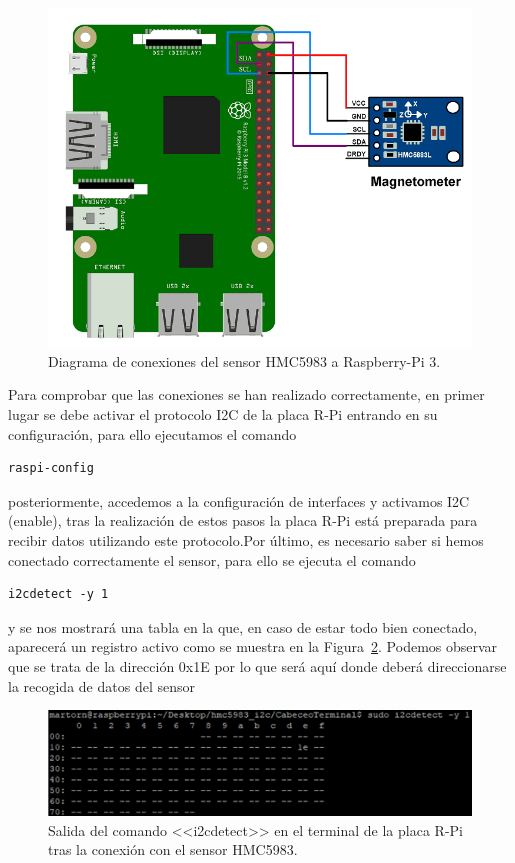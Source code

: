 \begin{figure}[th]
\centering
\includegraphics[scale=0.5]{images/conexionRaspHMC5983}
\caption[Conexión HMC5983 a Raspberry-Pi]{Diagrama de conexiones del sensor HMC5983 a Raspberry-Pi 3.}%
\label{fig:5983Rasp}
\end{figure}

Para comprobar que las conexiones se han realizado correctamente, en primer lugar se debe activar el protocolo I2C de la placa R-Pi entrando en su configuración, para ello ejecutamos el comando 
\begin{lstlisting}[style=terminal]
raspi-config
\end{lstlisting}
posteriormente, accedemos a la configuración de interfaces y activamos I2C (enable), tras la realización de estos pasos la placa R-Pi está preparada para recibir datos utilizando este protocolo.Por último, es necesario saber si hemos conectado correctamente el sensor, para ello se ejecuta el comando 

\begin{lstlisting}[style=terminal]
i2cdetect -y 1
\end{lstlisting}
 y se nos mostrará una tabla en la que, en caso de estar todo bien conectado, aparecerá un registro activo como se muestra en la Figura~\ref{fig:i2cDetect}. Podemos observar que se trata de la dirección 0x1E por lo que será aquí donde deberá direccionarse la recogida de datos del sensor
\begin{figure}[th]
\centering
\includegraphics{images/i2cdetect.png}
\caption[Comando <<i2cdetect>> con sensor HMC5983]{Salida del comando <<i2cdetect>> en el terminal de la placa R-Pi tras la conexión con el sensor HMC5983.}%
\label{fig:i2cDetect}
\end{figure}


